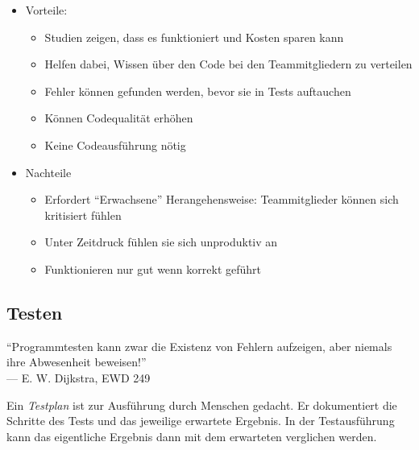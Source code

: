 \documentclass[
    ngerman,
    color=3b,
    summary,
    boxarc,
    main,
]{rubos-tuda-template}
\begin{document}
\begin{itemize}
    \item Vorteile: \begin{itemize}
              \item Studien zeigen, dass es funktioniert und Kosten sparen kann
              \item Helfen dabei, Wissen über den Code bei den Teammitgliedern zu verteilen
              \item Fehler können gefunden werden, bevor sie in Tests auftauchen
              \item Können Codequalität erhöhen
              \item Keine Codeausführung nötig
          \end{itemize}
    \item Nachteile\begin{itemize}
              \item Erfordert \enquote{Erwachsene} Herangehensweise: Teammitglieder können sich kritisiert fühlen
              \item Unter Zeitdruck fühlen sie sich unproduktiv an
              \item Funktionieren nur gut wenn korrekt geführt
          \end{itemize}
\end{itemize}
\clearpage
\subsection{Testen}
\begin{defBox}
    \enquote{Programmtesten kann zwar die Existenz von Fehlern aufzeigen, aber niemals ihre Abwesenheit beweisen!}\mbox{}\\\mbox{}\hfill — E. W. Dijkstra, EWD 249
\end{defBox}
\begin{definition}[Testplan]
    Ein \textit{Testplan} ist zur Ausführung durch Menschen gedacht. Er dokumentiert die Schritte des Tests und das jeweilige erwartete Ergebnis. In der Testausführung kann das eigentliche Ergebnis dann mit dem erwarteten verglichen werden.
\end{definition}
\end{document}
